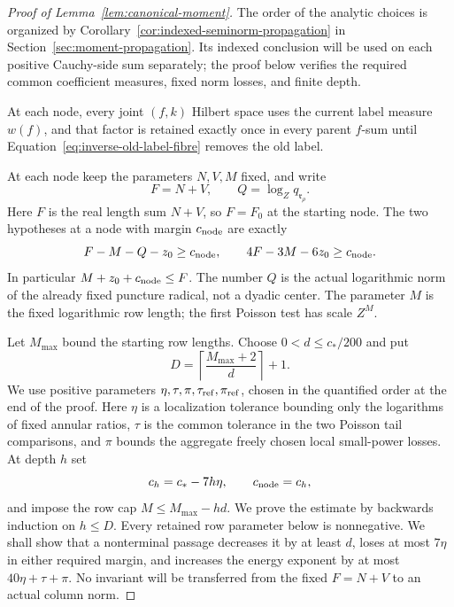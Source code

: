 \documentclass[11pt,a4paper]{article}
\numberwithin{equation}{section}
\numberwithin{figure}{section}
\theoremstyle{definition}
\theoremstyle{remark}
\begin{document}
\begin{proof}[Proof of Lemma~\ref{lem:canonical-moment}]
The order of the analytic choices is organized by
Corollary~\ref{cor:indexed-seminorm-propagation} in
Section~\ref{sec:moment-propagation}. Its indexed conclusion will be
used on each positive Cauchy-side sum separately; the proof below verifies
the required common coefficient measures, fixed norm losses, and finite depth.

At each node, every joint \((f,k)\) Hilbert space uses the current label
measure \(w(f)\), and that factor is retained exactly once in every
parent \(f\)-sum until Equation~\eqref{eq:inverse-old-label-fibre}
removes the old label.

At each node keep the parameters \(N,V,M\) fixed, and write
\[
 F=N+V,\qquad Q=\log_Zq_{\mathfrak r_\rho}.
\]
Here \(F\) is the real length sum \(N+V\), so \(F=F_0\) at the starting
node.  The two hypotheses at a node with margin \(c_{\rm node}\) are exactly
\begin{equation}\label{eq:inverse-fixed-invariant}
 F-M-Q-z_0\ge c_{\rm node},\qquad
 4F-3M-6z_0\ge c_{\rm node}.
\end{equation}
In particular \(M+z_0+c_{\rm node}\le F\).  The number \(Q\) is the
actual logarithmic norm of the already fixed puncture radical, not a
dyadic center.  The parameter \(M\) is the fixed logarithmic row length;
the first Poisson test has scale \(Z^M\).

Let \(M_{\max}\) bound the starting row lengths.  Choose
\(0<d\le c_*/200\) and put
\[
 D=\left\lceil\frac{M_{\max}+2}{d}\right\rceil+1.
\]
We use positive parameters \(\eta,\tau,\pi,\tau_{\rm ref},\pi_{\rm ref}\),
chosen in the quantified order at the end of the proof.  Here \(\eta\)
is a localization tolerance bounding only the logarithms of fixed annular
ratios, \(\tau\) is the common tolerance in the two Poisson tail comparisons,
and \(\pi\) bounds the aggregate freely chosen local small-power losses.  At depth
\(h\) set
\[
 c_h=c_*-7h\eta,\qquad c_{\rm node}=c_h,
\]
and impose the row cap \(M\le M_{\max}-hd\).  We prove the estimate by
backwards induction on \(h\le D\).  Every retained row parameter below
is nonnegative.  We shall show that a nonterminal passage decreases it
by at least \(d\), loses at most \(7\eta\) in either required margin,
and increases the energy exponent by at most \(40\eta+\tau+\pi\).
No invariant will be transferred from the fixed \(F=N+V\) to an
actual column norm.


\end{proof}
\end{document}
